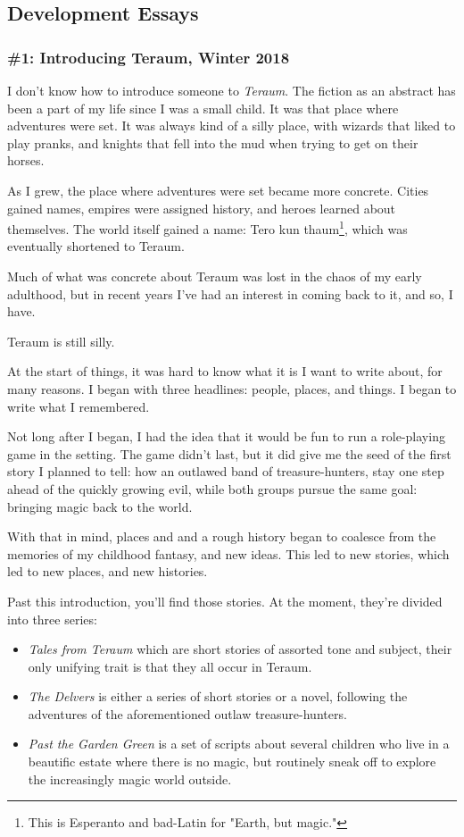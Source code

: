 \documentclass[11pt]{article}
\begin{document}
\subsection*{Development Essays}
\label{sec:org3b67461}
\startcontents[level-2]
\subsubsection*{\#1: Introducing Teraum, Winter 2018}
\label{sec:orgbedc416}
I don't know how to introduce someone to \emph{Teraum}. The fiction as an
abstract has been a part of my life since I was a small child. It was
that place where adventures were set. It was always kind of a silly
place, with wizards that liked to play pranks, and knights that fell
into the mud when trying to get on their horses.

As I grew, the place where adventures were set became more concrete.
Cities gained names, empires were assigned history, and heroes learned
about themselves. The world itself gained a name: Tero kun
thaum\footnote{This is Esperanto and bad-Latin for "Earth, but magic."}, which was eventually shortened to Teraum.

Much of what was concrete about Teraum was lost in the chaos of my
early adulthood, but in recent years I've had an interest in coming
back to it, and so, I have.

Teraum is still silly.

At the start of things, it was hard to know what it is I want to write
about, for many reasons. I began with three headlines: people, places,
and things. I began to write what I remembered.

Not long after I began, I had the idea that it would be fun to run a
role-playing game in the setting. The game didn't last, but it did
give me the seed of the first story I planned to tell: how an outlawed
band of treasure-hunters, stay one step ahead of the quickly growing
evil, while both groups pursue the same goal: bringing magic back to
the world.

With that in mind, places and and a rough history began to coalesce
from the memories of my childhood fantasy, and new ideas. This led to
new stories, which led to new places, and new histories.

Past this introduction, you'll find those stories. At the moment,
they're divided into three series:

\begin{itemize}
\item \emph{Tales from Teraum} which are short stories of assorted tone and
subject, their only unifying trait is that they all occur in Teraum.
\item \emph{The Delvers} is either a series of short stories or a novel,
following the adventures of the aforementioned outlaw
treasure-hunters.
\item \emph{Past the Garden Green} is a set of scripts about several children
who live in a beautific estate where there is no magic, but
routinely sneak off to explore the increasingly magic world outside.
\end{itemize}
\end{document}
